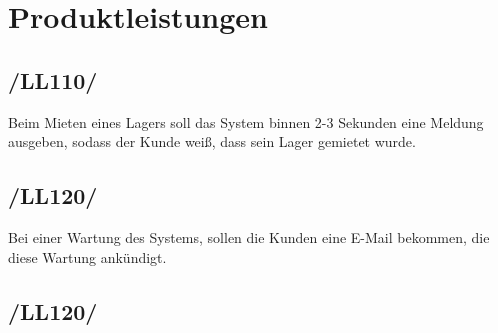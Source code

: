 
\section{Produktleistungen}
\subsection*{/LL110/}
Beim Mieten eines Lagers soll das System binnen 2-3 Sekunden eine Meldung ausgeben, sodass der Kunde weiß, dass sein Lager gemietet wurde.
\subsection*{/LL120/}
Bei einer Wartung des Systems, sollen die Kunden eine E-Mail bekommen, die diese Wartung ankündigt.
\subsection*{/LL120/}
